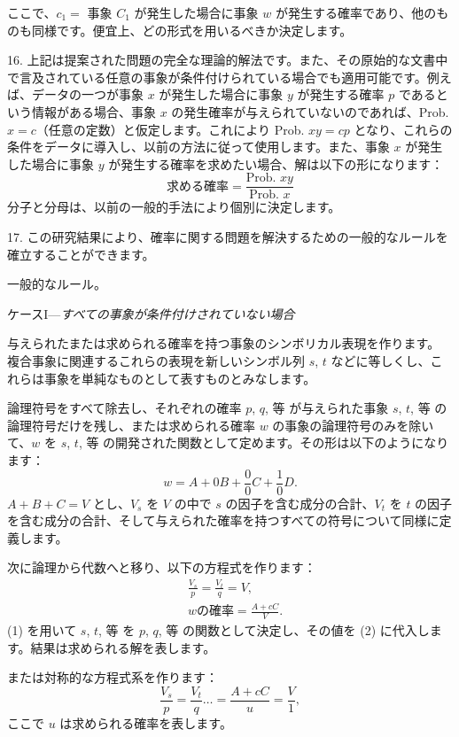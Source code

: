 \documentclass[a4paper,11pt,openany]{ltjsbook}
\begin{document}
ここで、$c_1 =$ 事象 $C_1$ が発生した場合に事象 $w$ が発生する確率であり、他のものも同様です。便宜上、どの形式を用いるべきか決定します。

16. 上記は提案された問題の完全な理論的解法です。また、その原始的な文書中で言及されている任意の事象が条件付けられている場合でも適用可能です。例えば、データの一つが事象 $x$ が発生した場合に事象 $y$ が発生する確率 $p$ であるという情報がある場合、事象 $x$ の発生確率が与えられていないのであれば、Prob. $x = c$（任意の定数）と仮定します。これにより Prob. $xy = cp$ となり、これらの条件をデータに導入し、以前の方法に従って使用します。また、事象 $x$ が発生した場合に事象 $y$ が発生する確率を求めたい場合、解は以下の形になります：
\[
  \text{求める確率} = \frac{\text{Prob. }xy}{\text{Prob. }x}
\]
分子と分母は、以前の一般的手法により個別に決定します。

17. この研究結果により、確率に関する問題を解決するための一般的なルールを確立することができます。

\centerline{\textsc{一般的なルール。}}

\textsc{ケースI}---\emph{すべての事象が条件付けされていない場合}

与えられたまたは求められる確率を持つ事象のシンボリカル表現を作ります。
複合事象に関連するこれらの表現を新しいシンボル列 $s$, $t$ などに等しくし、これらは事象を単純なものとして表すものとみなします。

論理符号をすべて除去し、それぞれの確率 $p$, $q$, 等 が与えられた事象 $s$, $t$, 等 の論理符号だけを残し、または求められる確率 $w$ の事象の論理符号のみを除いて、$w$ を $s$, $t$, 等 の開発された関数として定めます。その形は以下のようになります：
\[
  w = A + 0B + \frac{0}{0}C + \frac{1}{0}D.
\]
$A + B + C = V$ とし、$V_s$ を $V$ の中で $s$ の因子を含む成分の合計、$V_t$ を $t$ の因子を含む成分の合計、そして与えられた確率を持つすべての符号について同様に定義します。

次に論理から代数へと移り、以下の方程式を作ります：
\begin{align*}
  &\frac{V_s}{p} = \frac{V_t}{q} = V,  \tag{1}  \\
  &w の確率 = \frac{A + cC}{V}. \tag{2}
\end{align*}
(1) を用いて $s$, $t$, 等 を $p$, $q$, 等 の関数として決定し、その値を (2) に代入します。結果は求められる解を表します。

または対称的な方程式系を作ります：
\[
  \frac{V_s}{p} = \frac{V_t}{q} \dotsc =  \frac{A+cC}{u}
 = \frac{V}{1},  \tag{3}
\]
ここで $u$ は求められる確率を表します。
\end{document}
